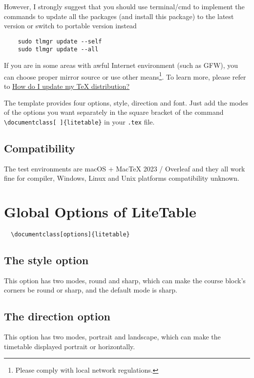\documentclass[11pt]{article}
\def\pkg#1{\texorpdfstring{\textcolor{pkgcolor}{\textsf{#1}}}{“#1”}}
\def\mode#1{\texorpdfstring{\textcolor{moducolor}{\textsf{#1}}}{“#1”}}
\begin{document}
However, I strongly suggest that you should use terminal/cmd to implement the commands to update all the packages (and install this package) to the latest version or switch to portable version instead
\begin{verbatim}
    sudo tlmgr update --self
    sudo tlmgr update --all
\end{verbatim}

If you are in some areas with awful Internet environment (such as GFW), you can choose proper mirror source or use other means\footnote{Please comply with local network regulations.}. To learn more, please refer to \href{https://tex.stackexchange.com/questions/55437/how-do-i-update-my-tex-distribution}{How do I update my \TeX{} distribution?}

The template provides four options, \mode{style}, \mode{direction} and \mode{font}. Just add the modes of the options you want separately in the square bracket of the command \verb|\documentclass[ ]{litetable}| in your \verb|.tex| file.

\subsection{Compatibility}
The test environments are macOS + MacTeX 2023 / Overleaf and they all work fine for \XeLaTeX{} compiler, Windows, Linux and Unix platforms compatibility unknown.

\section{Global Options of \pkg{LiteTable}}
\begin{verbatim}
  \documentclass[options]{litetable}
\end{verbatim}

\subsection{The \mode{style} option}
This option has two modes, \mode{round} and \mode{sharp}, which can make the course block's corners be round or sharp, and the default mode is sharp.

\subsection{The \mode{direction} option}
This option has two modes, \mode{portrait} and \mode{landscape}, which can make the timetable displayed portrait or horizontally.
\end{document}
